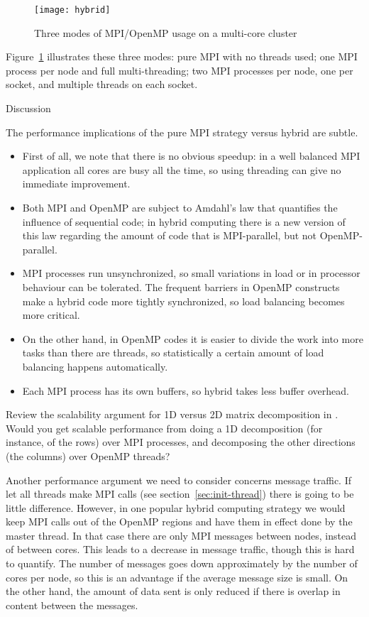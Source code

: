 \begin{figure}[ht]
  \texttt{[image: hybrid]}
  \caption{Three modes of MPI/OpenMP usage on a multi-core cluster}
  \label{fig:hybrid-modes}
\end{figure}
%
Figure~\ref{fig:hybrid-modes} illustrates these three modes: pure MPI
with no threads used; one MPI process per node and full
multi-threading; two MPI processes per node, one per socket, and
multiple threads on each socket.

 {Discussion}

The performance implications of the pure MPI strategy versus hybrid
are subtle.
\begin{itemize}
\item First of all, we note that there is no obvious speedup: in a
  well balanced MPI application all cores are busy all the time, so
  using threading can give no immediate improvement.
\item Both MPI and OpenMP are subject to Amdahl's law that quantifies
  the influence of sequential code; in hybrid computing there is a new
  version of this law regarding the amount of code that is
  MPI-parallel, but not OpenMP-parallel.
\item MPI processes run unsynchronized, so small variations in load or
  in processor behaviour can be tolerated. The frequent barriers in
  OpenMP constructs make a hybrid code more tightly synchronized, so
  load balancing becomes more critical.
\item On the other hand, in OpenMP codes it is easier to divide the
  work into more tasks than there are threads, so statistically a
  certain amount of load balancing happens automatically.
\item Each MPI process has its own buffers, so hybrid takes less
  buffer overhead.
\end{itemize}

\begin{exercise}
  Review the scalability argument for 1D versus 2D matrix
  decomposition in . Would you get
  scalable performance from doing a 1D decomposition (for instance, of
  the rows) over MPI processes, and decomposing the other directions
  (the columns) over OpenMP threads?
\end{exercise}

Another performance argument we need to consider concerns message
traffic.  If let all threads make MPI calls (see
section~\ref{sec:init-thread}) there is going to be little
difference. However, in one popular hybrid computing strategy we would
keep MPI calls out of the OpenMP regions and have them in effect done
by the master thread.
%
In that case there are only MPI messages
between nodes, instead of between cores. This leads to a decrease in
message traffic, though this is hard to quantify. The number of
messages goes down approximately by the number of cores per node, so
this is an advantage if the average message size is small. On the
other hand, the amount of data sent is only reduced if there is
overlap in content between the messages.

